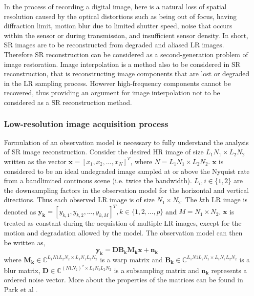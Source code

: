 In the process of recording a digital image, here is a natural loss of spatial resolution caused by the optical distortions such as being out of focus, having diffraction limit, motion blur due to limited shutter speed, noise that occurs within the sensor or during transmission, and insufficient sensor density. In short, SR images are to be reconstructed from degraded and aliased LR images. Therefore SR reconstruction can be considered as a second-generation problem of image restoration. Image interpolation is a method also to be considered in SR reconstruction, that is reconstructing image components that are lost or degraded in the LR sampling process. However high-frequency components cannot be recovered, thus providing an argument for image interpolation not to be considered as a SR reconstruction method. 

\subsubsection{Low-resolution image acquisition process} \label{secfss}
Formulation of an observation model is necessary to fully understand the analysis of SR image reconstruction. Consider the desired HR image of size $L_{1} N_{1} \times L_{2} N_{2}$ written as the vector $\mathbf{x} = [x_{1}, x_{2}, \ldots , x_{N}]^{T}$, where $N=L_{1} N_{1} \times L_{2} N_{2}$. $\mathbf{x}$ is considered to be an ideal undegraded image sampled at or above the Nyquist rate from a bandlimited continous scene (i.e. twice the bandwidth). $L_{i}, i \in \{1,2\}$ are the downsampling factors in the observation model for the horizontal and vertical directions. Thus each observed LR image is of size $N_{1} \times N_{2}$. The $k$th LR image is denoted as $\mathbf{y_{k}} = [y_{k,1}, y_{k,2}, \ldots , y_{k,M}]^{T}, k \in \{1,2,\ldots,p\}$ and $M = N_{1} \times N_{2}$. $\mathbf{x}$ is treated as constant during the acquistion of multiple LR images, except for the motion and degradation allowed by the model. The observation model can then be written as,
\begin{equation}
\mathbf{y_{k}} = \mathbf{D}\mathbf{B_{k}}\mathbf{M_{k}}\mathbf{x} + \mathbf{n_{k}}
\end{equation}
where $\mathbf{M_{k}} \in \mathbb{C}^{L_{1}N{1}L_{2}N_{2}\times L_{1}N_{1}L_{2}N_{2}}$ is a warp matrix and $\mathbf{B_{k}} \in \mathbb{C}^{L_{1}N{1}L_{2}N_{2}\times L_{1}N_{1}L_{2}N_{2}}$ is a blur matrix, $\mathbf{D} \in \mathbb{C}^{(N{1}N_{2})^{2}\times L_{1}N_{1}L_{2}N_{2}}$ is a subsampling matrix and $\mathbf{n_{k}}$ represents a ordered noise vector. More about the properties of the matrices can be found in Park et al \cite{Park2003}.

